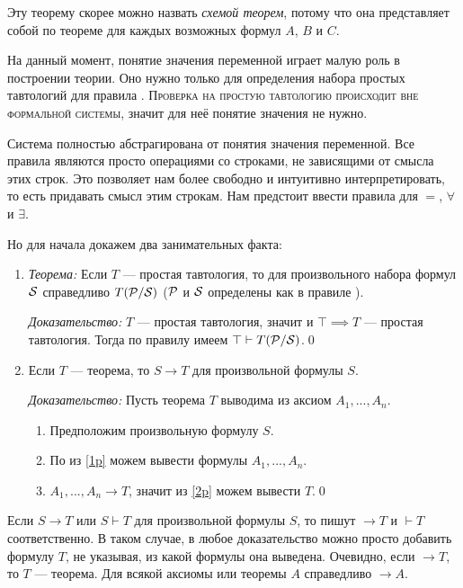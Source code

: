 Эту теорему скорее можно назвать {\it схемой теорем}, потому что она представляет
собой по теореме для каждых возможных формул $A$, $B$ и $C$.

На данный момент, понятие значения переменной играет малую роль в построении теории.
Оно нужно только для определения набора простых тавтологий для правила \taut{}.
\textsc{Проверка на простую тавтологию
	происходит вне формальной системы}, значит для неё понятие значения не нужно.

Система полностью абстрагирована от понятия значения переменной.
Все правила являются просто операциями со строками, не зависящими от смысла
этих строк. Это позволяет нам более свободно и интуитивно интерпретировать, то
есть придавать смысл этим строкам.
Нам предстоит ввести правила для $=$, $\forall$ и $\exists$.

Но для начала докажем два занимательных факта:

\begin{enumerate}
	\item{}{\it Теорема:}
	Если $T$ --- простая тавтология, то
	для произвольного набора формул $\mathcal S$ справедливо $T(\mathcal P/\mathcal S)$
	($\mathcal P$ и $\mathcal S$ определены как в правиле \taut{}).

		{\it Доказательство:}
	$T$ --- простая тавтология, значит и
	${\top\implies T}$ --- простая тавтология. Тогда по правилу \taut{} имеем
	$\top\vdash T(\mathcal P/\mathcal S)$.\qed

	\item{}Если $T$ --- теорема, то $S\to T$ для произвольной формулы $S$.

		{\it Доказательство:}
	Пусть теорема $T$ выводима из аксиом $A_1,...,A_{n}$.
	\begin{enumerate}[label=(\roman*)]
		\item{}\label{1p}Предположим произвольную формулу $S$.
		\item{}\label{2p}По \axiom{} из \ref{1p} можем вывести
		формулы $A_1,...,A_{n}$.
		\item{}\label{3p}$A_1,...,A_{n}\to T$, значит из \ref{2p} можем вывести $T$.\qed
	\end{enumerate}
\end{enumerate}

Если $S\to T$ или $S\vdash T$ для произвольной формулы $S$,
то пишут $\to T$ и $\vdash T$ соответственно. В таком случае,
в любое доказательство можно просто добавить формулу $T$,
не указывая, из какой формулы она выведена. Очевидно,
если $\to T$, то $T$ --- теорема. Для всякой аксиомы или теоремы $A$
справедливо $\to A$.

